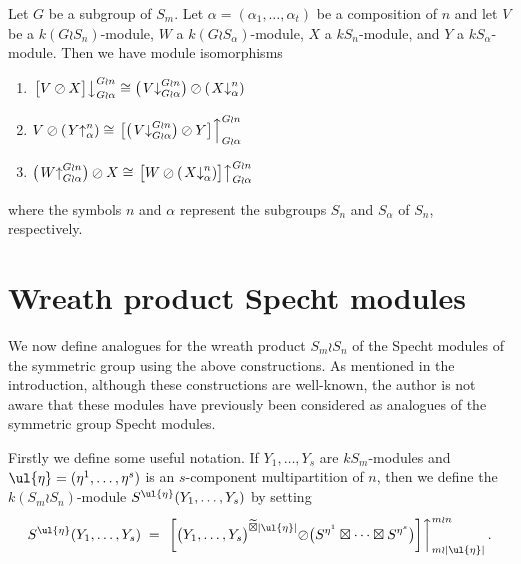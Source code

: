 \begin{prop}\label{wreath_ind_res:prop}\cite[Lemma 3.2]{CHTAN}
Let $G$ be a subgroup of $S_m$.
Let $\alpha = (\alpha_1,\ldots,\alpha_t)$ be a composition of $n$ and let $V$ be a $k(G{\wr}S_n)$-module, $W$ a
$k(G{\wr}S_\alpha)$-module, $X$ a $kS_n$-module, and $Y$ a $kS_\alpha$-module. Then we have module isomorphisms
\begin{enumerate}
\item $\left.\bigl[V \oslash X\bigr]\right\downarrow^{G{\wr}n}_{G{\wr}\alpha} \cong
\bigl(\left.V\right\downarrow^{G{\wr}n}_{G{\wr}\alpha}\bigr) \oslash \left(\left.X\right\downarrow^{n}_{\alpha}\right)$
\item $V \oslash \left(\left.Y\right\uparrow^{n}_{\alpha}\right)
\cong \left.\bigl[\bigl(\left.V\right\downarrow^{G{\wr}n}_{G{\wr}\alpha}\bigr) \oslash Y\bigr]\right\uparrow^{G{\wr}n}_{G{\wr}\alpha}$
\item $\bigl(\left.W\right\uparrow^{G{\wr}n}_{G{\wr}\alpha}\bigr) \oslash X
\cong \left.\bigl[W \oslash \left(\left.X\right\downarrow^{n}_{\alpha}\right)\bigr]\right\uparrow^{G{\wr}n}_{G{\wr}\alpha}$
\end{enumerate}
where the symbols $n$ and $\alpha$ represent the subgroups $S_n$ and $S_\alpha$ of $S_n$, respectively.
\end{prop}

\section{Wreath product Specht modules}
We now define analogues for the wreath product $S_m \wr S_n$ of the Specht modules of the symmetric group using the above constructions.
As mentioned in the introduction, although these constructions are well-known, the author is not aware that these modules have
previously been considered as analogues of the symmetric group Specht modules.

Firstly we define some useful notation. If $Y_1,\ldots,Y_s$ are $kS_m$-modules and $\ul{\eta} = (\eta^1,\ldots,\eta^s)$ is an
$s$-component multipartition of $n$, then we define the $k(S_m{\wr}S_n)$-module $S^{\ul{\eta}}(Y_1,\ldots,Y_s)$ by setting
\[
S^{\ul{\eta}}(Y_1,\ldots,Y_s)\;=\; \left.\left[\bigl(Y_1,\ldots,Y_s\bigr)^{\widetilde\boxtimes |\ul{\eta}|}{\oslash}
\bigl(S^{\eta^1}\boxtimes\cdots\boxtimes S^{\eta^s}\bigr)\right]\right\uparrow^{m{\wr}n}_{m{\wr}|\ul{\eta}|}.
\]

